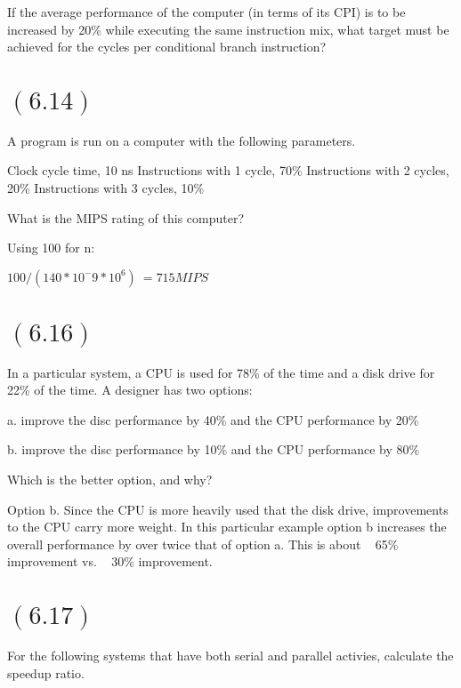 \documentclass[letterpaper,12pt,titlepage]{article}
\begin{document}
If the average performance of the computer (in terms of its CPI) is to be increased by 20\% while executing the same instruction mix, what target must be achieved for the cycles per conditional branch instruction?

\begin{mdframed}[style=MyFrame]
\end{mdframed}

\section*{$(6.14)$} A program is run on a computer with the following parameters.

Clock cycle time, 10 ns
Instructions with 1 cycle, 70\%
Instructions with 2 cycles, 20\%
Instructions with 3 cycles, 10\%

What is the MIPS rating of this computer?

\begin{mdframed}[style=MyFrame]
Using 100 for n:

$ 100 / (140 * 10^-9 * 10 ^ 6) ~= 715 MIPS $
\end{mdframed}

\section*{$(6.16)$} In a particular system, a CPU is used for 78\% of the time and a disk drive for 22\% of the time. A designer has two options:

a. improve the disc performance by 40\% and the CPU performance by 20\%

b. improve the disc performance by 10\% and the CPU performance by 80\%

Which is the better option, and why?

\begin{mdframed}[style=MyFrame]
Option b. Since the CPU is more heavily used that the disk drive, improvements to the CPU carry more weight. In this particular example option b increases the overall performance by over twice that of option a. This is about ~ 65\% improvement vs. ~ 30\% improvement.
\end{mdframed}

\section*{$(6.17)$} For the following systems that have both serial and parallel activies, calculate the speedup ratio.
\end{document}
